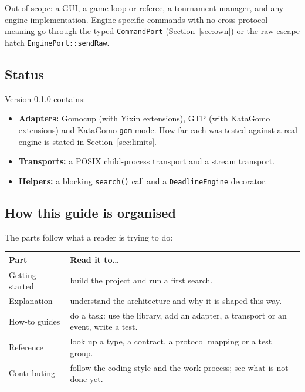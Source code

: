 \documentclass[11pt,a4paper]{article}
\newcommand{\code}[1]{\texttt{#1}}
\begin{document}
\noindent Out of scope: a GUI, a game loop or referee, a tournament manager, and any engine
implementation. Engine-specific commands with no cross-protocol meaning go through the typed
\code{CommandPort} (Section~\ref{sec:own}) or the raw escape hatch \code{EnginePort::sendRaw}.

\subsection{Status}

Version 0.1.0 contains:

\begin{itemize}
  \item \textbf{Adapters:} Gomocup (with Yixin extensions), GTP (with KataGomo
        extensions) and KataGomo \code{gom} mode. How far each was tested against a real engine
        is stated in Section~\ref{sec:limits}.
  \item \textbf{Transports:} a POSIX child-process transport and a stream transport.
  \item \textbf{Helpers:} a blocking \code{search()} call and a \code{DeadlineEngine} decorator.
\end{itemize}

\subsection{How this guide is organised}

The parts follow what a reader is trying to do:

\begin{center}
\small
\begin{tabularx}{\textwidth}{@{}l X@{}}
\toprule
\textbf{Part} & \textbf{Read it to\ldots} \\
\midrule
Getting started & build the project and run a first search. \\
Explanation     & understand the architecture and why it is shaped this way. \\
How-to guides   & do a task: use the library, add an adapter, a transport or an event, write a
                  test. \\
Reference       & look up a type, a contract, a protocol mapping or a test group. \\
Contributing    & follow the coding style and the work process; see what is not done yet. \\
\bottomrule
\end{tabularx}
\end{center}
\end{document}
